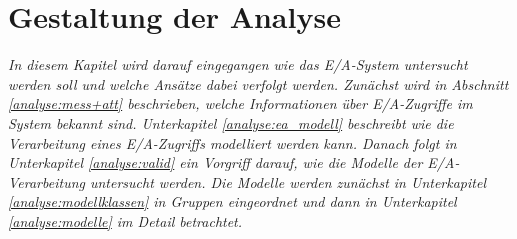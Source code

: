 \documentclass[
	12pt,
	a4paper,
	BCOR10mm,
	DIV14,
	listof=totoc,
	bibliography=totoc,
	headsepline
]{scrreprt}
\begin{document}
\chapter{Gestaltung der Analyse}
\textit{	
In diesem Kapitel wird darauf eingegangen wie das E/A-System untersucht werden soll und welche Ansätze dabei verfolgt werden.
Zunächst wird in Abschnitt \ref{analyse:mess+att} beschrieben, welche Informationen über E/A-Zugriffe im System bekannt sind. Unterkapitel \ref{analyse:ea_modell} beschreibt wie die Verarbeitung eines E/A-Zugriffs modelliert werden kann.
Danach folgt in Unterkapitel \ref{analyse:valid} ein Vorgriff darauf, wie die Modelle der E/A-Verarbeitung untersucht werden. Die Modelle werden zunächst in Unterkapitel \ref{analyse:modellklassen} in Gruppen eingeordnet und dann in Unterkapitel \ref{analyse:modelle} im Detail betrachtet.
}
\bigskip
\end{document}
